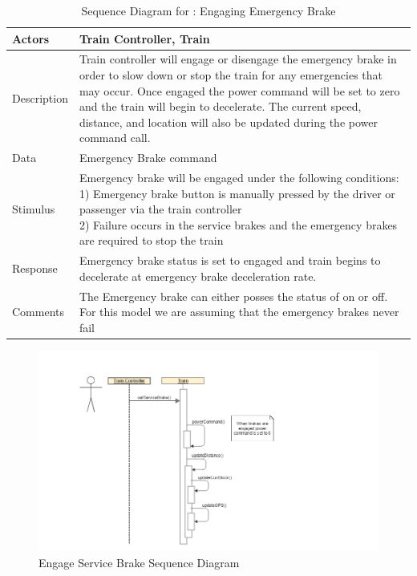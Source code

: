\documentclass[]{article}
\begin{document}
	\begin{table}[H]
	\centering
	\caption{Sequence Diagram for : Engaging Emergency Brake}
	\begin{tabular}{|l|l|}
		\hline
		Actors & \parbox[t]{10cm}{Train Controller, Train} \\ \hline
		Description & \parbox[t]{10cm}{Train controller will engage or disengage the emergency brake in order to slow down or stop the train for any emergencies that may occur. Once engaged the power command will be set to zero and the train will begin to decelerate. The current speed, distance, and location will also be updated during the power command call.} \\ \hline
		Data &  \parbox[t]{10cm}{Emergency Brake command } \\ \hline
		Stimulus &  \parbox[t]{10cm}{Emergency brake will be engaged under the following conditions:\\1) Emergency brake button is manually pressed by the driver or passenger via the train controller\\2) Failure occurs in the service brakes and the emergency brakes are required to stop the train  } \\ \hline
		Response & \parbox[t]{10cm}{Emergency brake status is set to engaged and train begins to decelerate at emergency brake deceleration rate.}\\ \hline
		Comments & \parbox[t]{10cm}{The Emergency brake can either posses the status of on or off. For this model we are assuming that the emergency brakes never fail}  \\ \hline
	\end{tabular}
\end{table}

\begin{figure}[H]
	\centering
	\includegraphics[scale=.5]{train_model_sqd_engage_service_brake.png}
	\caption{Engage Service Brake Sequence Diagram}
\end{figure}
\end{document}
